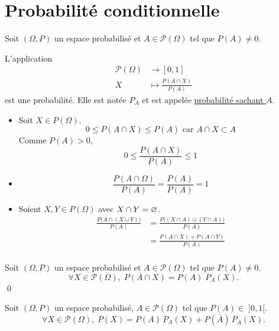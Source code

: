 \part{Probabilité conditionnelle}

\begin{prop-defn}
	Soit $(\Omega, P)$ un espace probabilisé et $A \in \mathcal{P}(\Omega)$ tel que $P(A) \neq 0$.

	L'application \begin{align*}
		\mathcal{P}(\Omega) &\longrightarrow [0,1] \\
		X &\longmapsto \frac{P(A \cap X)}{P(A)}
	\end{align*} est une probabilité. Elle est notée $P_A$ et est appelée \underline{probabilité sachant $A$}. 
\end{prop-defn}

\begin{prv}
	\begin{itemize}
		\item Soit $X \in P(\Omega)$. \[
				0 \le P(A \cap X) \le P(A) \text{ car } A \cap X \subset A
			\] Comme $P(A) > 0$, \[
				0 \le \frac{P(A \cap X)}{P(A)} \le 1
			\]
		\item \[
				\frac{P(A \cap \Omega)}{P(A)} = \frac{P(A)}{P(A)} = 1
			\]
		\item Soient $X, Y \in P(\Omega)$ avec $X \cap Y = \varnothing$.
			\begin{align*}
				\frac{P\big(A \cap (X \cup Y)\big)}{P(A)} &= \frac{P\big((X \cap A)\cupdot (Y \cap A)\big)}{P(A)}\\
				&= \frac{P(A \cap X) + P(A \cap Y)}{P(A)} \\
			\end{align*}
	\end{itemize}
\end{prv}

\begin{prop}
	Soit $(\Omega, P)$ un espace probabilisé et $A \in \mathcal{P}(\Omega)$ tel que $P(A) \neq 0$. \[
		\forall X \in \mathcal{P}(\Omega),\; P(A \cap X) = P(A)\;P_A(X).
	\] \qed
\end{prop}

\begin{prop}
	Soit $(\Omega, P)$ un espace probabilisé, $A \in \mathcal{P}(\Omega)$ tel que $P(A) \in\; ]0,1[$. \[
		\forall X \in \mathcal{P}(\Omega),\;P(X) = P(A)\,P_A(X) + P\left( \overline{A} \right)\,P_{\overline{A}}(X).
	\]
\end{prop}

